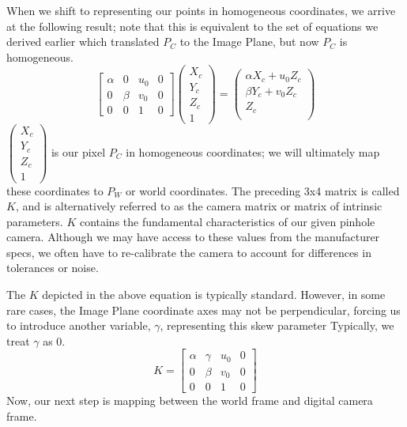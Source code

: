 \documentclass[]{article}
\begin{document}
When we shift to representing our points in homogeneous coordinates, we arrive at the following result; note that this is equivalent to the set of equations we derived earlier which translated $P_C$ to the Image Plane, but now $P_C$ is homogeneous.
\begin{equation}
\begin{bmatrix}
\alpha & 0 & u_{0} & 0 \\
0 & \beta & v_{0} & 0  \\
0 & 0 & 1 & 0
\end{bmatrix}
\begin{pmatrix}
X_{c} \\
Y_{c} \\
Z_{c} \\
1
\end{pmatrix}
=
\begin{pmatrix}
\alpha X_{c} + u_{0}Z_{c} \\
\beta Y_{c} + v_{0}Z_{c} \\
Z_{c} \\
\end{pmatrix}
\end{equation}
$\begin{pmatrix}
X_{c} \\
Y_{c} \\
Z_{c} \\
1
\end{pmatrix}
$
is our pixel $P_C$ in homogeneous coordinates; we will ultimately map these coordinates to $P_W$ or world coordinates.
The preceding 3x4 matrix is called $K$, and is alternatively referred to as the camera matrix or matrix of intrinsic parameters. $K$ contains the fundamental characteristics of our given pinhole camera. Although we may have access to these values from the manufacturer specs, we often have to re-calibrate the camera to account for differences in tolerances or noise.

The $K$ depicted in the above equation is typically standard. However, in some rare cases, the Image Plane coordinate axes may not be perpendicular, forcing us to introduce another variable, $\gamma$, representing this skew parameter Typically, we treat $\gamma$ as 0.
\begin{equation}
K =
\begin{bmatrix}
\alpha & \gamma & u_{0} & 0 \\
0 & \beta & v_{0} & 0  \\
0 & 0 & 1 & 0
\end{bmatrix}
\end{equation}
Now, our next step is mapping between the world frame and digital camera frame.
\end{document}
